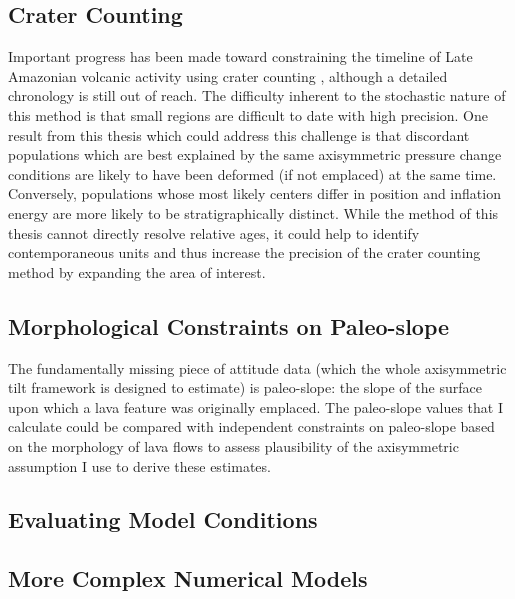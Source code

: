 \subsection{Crater Counting}
Important progress has been made toward constraining the timeline of Late Amazonian volcanic activity using crater counting \parencite{kneissl_map-projection-independent_2011,robbins_volcanic_2011,
robbins_large_2013,
platz_crater-based_2013}, although a detailed chronology is still out of reach. The difficulty inherent to the stochastic nature of this method is that small regions are difficult to date with high precision. One result from this thesis which could address this challenge is that discordant populations which are best explained by the same axisymmetric pressure change conditions are likely to have been deformed (if not emplaced) at the same time. Conversely, populations whose most likely centers differ in position and inflation energy are more likely to be stratigraphically distinct. While the method of this thesis cannot directly resolve relative ages, it could help to identify contemporaneous units and thus increase the precision of the crater counting method by expanding the area of interest.

\subsection{Morphological Constraints on Paleo-slope}

The fundamentally missing piece of attitude data (which the whole axisymmetric tilt framework is designed to estimate) is paleo-slope: the slope of the surface upon which a lava feature was originally emplaced. The paleo-slope values that I calculate could be compared with independent constraints on paleo-slope based on the morphology of lava flows \parencite{wadge_lobes_1991, peitersen_correlations_2000, peters_lava_2021} to assess plausibility of the axisymmetric assumption I use to derive these estimates.

\subsection{Evaluating Model Conditions}

\subsection{More Complex Numerical Models}